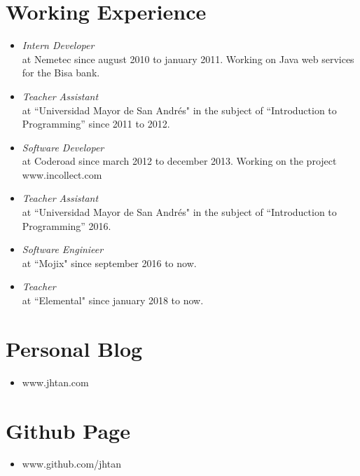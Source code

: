 \documentclass[margin, 10pt]{res} %
\begin{document}
\begin{resume}
\section{Working Experience}
\begin{itemize}
\item[] {\sl Intern Developer} \\
at Nemetec since august 2010 to january 2011. Working on Java web services for the Bisa bank. \\
\item[] {\sl Teacher Assistant} \\
at ``Universidad Mayor de San Andr\'es" in the subject of ``Introduction to Programming'' since 2011 to 2012. \\
\item[] {\sl Software Developer} \\
  at Coderoad since march 2012 to december 2013. Working on the project www.incollect.com \\
\item[] {\sl Teacher Assistant} \\
   at ``Universidad Mayor de San Andr\'es" in the subject of ``Introduction to Programming'' 2016. \\
 \item[] {\sl Software Enginieer} \\
   at ``Mojix" since september 2016 to now.\\
 \item[] {\sl Teacher} \\
  at ``Elemental" since january 2018 to now.\\
\end{itemize}

\section{Personal Blog}
\begin{itemize}
\item[] www.jhtan.com
\end{itemize}

\section{Github Page}
\begin{itemize}
\item[] www.github.com/jhtan
\end{itemize}


\end{resume}
\end{document}
